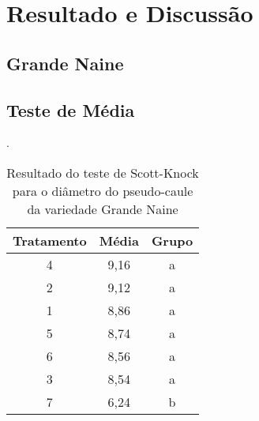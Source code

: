 \chapter{Resultado e Discussão}
\section{Grande Naine}

\section{Teste de Média}
  
 
\begin{table}[!htb]
 	\begin{center}
 		\caption{Resultado do teste de Scott-Knock para o diâmetro do pseudo-caule da variedade Grande Naine}.
	 	\begin{tabular}{|c|c|c|}
 		\hline
 		\hline
 		\textbf{Tratamento} & \textbf{Média}  & \textbf{Grupo}\\
 		\hline
 		4 & 9,16 & a \\
 		\hline
 		2 & 9,12 & a \\
		\hline
 		1 & 8,86 & a \\
		\hline
 		5 & 8,74 & a \\
		\hline
 		6 & 8,56  & a \\
		\hline
 		3 & 8,54  & a \\
		\hline
 		7 & 6,24   & b \\
		\hline
 		\end{tabular}
 	\end{center}
\end{table}